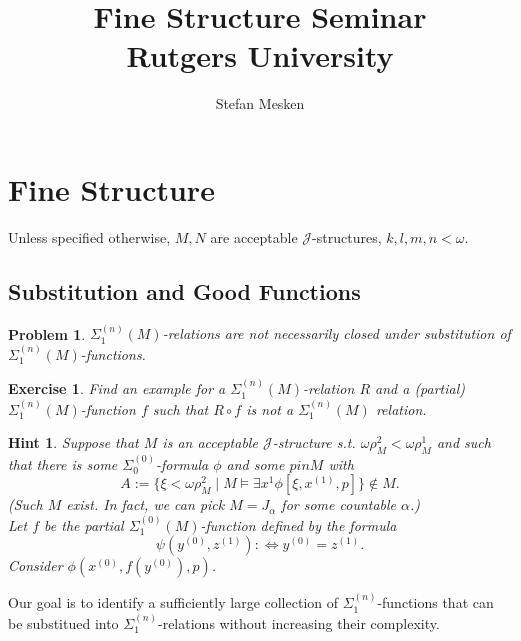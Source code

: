 \documentclass[12pt,a4paper]{article}
\theoremstyle{nicestyle}
\newtheorem{problem}{Problem}[subsection]
\newtheorem{hint}{Hint}[subsection]
\newtheorem{exercise}{Exercise}[subsection]
\begin{document}
\author{Stefan Mesken}
\title{Fine Structure Seminar \\
Rutgers University}
\maketitle

\setcounter{section}{0}
\section{Fine Structure}

Unless specified otherwise, $M,N$ are acceptable
$\mathcal{J}$-structures, $k,l,m,n < \omega$.

\setcounter{subsection}{7}
\subsection{Substitution and Good Functions}


\begin{problem}
  $\Sigma^{(n)}_1(M)$-relations are not necessarily closed under
  substitution of $\Sigma^{(n)}_1(M)$-functions.
\end{problem}

\begin{exercise}
  Find an example for a $\Sigma^{(n)}_1(M)$-relation $R$ and a
  (partial) $\Sigma^{(n)}_1(M)$-function $f$ such that $R \circ f$ is
  not a $\Sigma^{(n)}_1(M)$ relation.
\end{exercise}

\begin{hint}
  Suppose that $M$ is an acceptable $\mathcal{J}$-structure
  s.t. $\omega \rho^2_M < \omega \rho^1_M$ and such that there is some
  $\Sigma^{(0)}_0$-formula $\phi$ and some $p in M$ with
  \[
    A := \{ \xi < \omega \rho^2_M \mid M \models \exists x^1 \phi [
    \xi, x^{(1)}, p ] \} \not \in M.
  \]
  (Such $M$ exist. In fact, we can pick $M = J_{\alpha}$ for some countable $\alpha$.) \\
  Let $f$ be the partial $\Sigma^{(0)}_1(M)$-function defined by the
  formula
  \[
    \psi(y^{(0)}, z^{(1)}) : \iff y^{(0)} = z^{(1)}.
  \]
 Consider $\phi(x^{(0)}, f(y^{(0)}), p)$.
\end{hint}

Our goal is to identify a sufficiently large collection of
$\Sigma^{(n)}_1$-functions that can be substitued into
$\Sigma^{(n)}_1$-relations without increasing their complexity.
\end{document}
